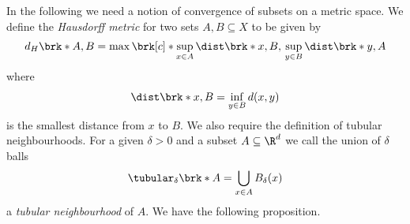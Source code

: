 In the following we need a notion of convergence of subsets on a metric space.
We define the \emph{Hausdorff metric} for two sets $A,B\subseteq X$ to be given by 
\begin{align}
  d_H\brk*{A,B}=\max\brk[c]*{\sup_{x\in A}\dist\brk*{x,B},\,\sup_{y\in B}\dist\brk*{y,A}}
  \label{eq:def_HausdorffMetric}
\end{align}
where
\begin{align}
  \dist\brk*{x,B}=\inf_{y\in B}d(x,y)\label{eq:def_distance}
\end{align}
is the smallest distance from $x$ to $B$.
We also require the definition of tubular neighbourhoods.
For a given $\delta>0$ and a subset $A\subseteq\R^d$ we call the union of $\delta$ balls
\begin{align}
  \tubular_\delta\brk*{A}=\bigcup_{x\in A}B_\delta(x)\label{eq:def_tubularNbh}
\end{align}
a \emph{tubular neighbourhood} of $A$.
We have the following proposition.

